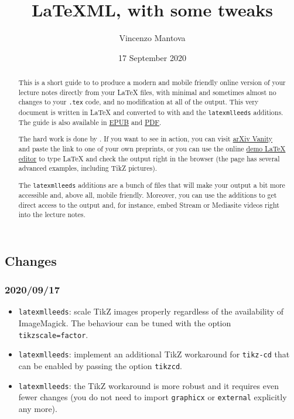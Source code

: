 \documentclass[a4paper]{article}
\title{LaTeXML, with some tweaks}
\author{Vincenzo Mantova}
\date{17 September 2020}
\theoremstyle{definition}
\begin{document}
\maketitle

\begin{abstract}
  This is a short guide to \LaTeXML{} to produce a modern and mobile friendly online version of your lecture notes directly from your \LaTeX{} files, with minimal and sometimes almost no changes to your \verb|.tex| code, and no modification at all of the \HTML{} output. This very document is written in \LaTeX{} and converted to \HTML{} with \LaTeXML{} and the \verb|latexmlleeds| additions. The guide is also available in \href{LaTeXML-Leeds.epub}{EPUB} and \href{LaTeXML-Leeds.pdf}{PDF}.

  The hard work is done by \LaTeXML{}. If you want to see \LaTeXML{} in action, you can visit \href{https://www.arxiv-vanity.com/}{arXiv Vanity} and paste the link to one of your own preprints, or you can use the online \href{https://latexml.mathweb.org/editor}{demo \LaTeX{} editor} to type \LaTeX{} and check the \HTML{} output right in the browser (the page has several advanced examples, including TikZ pictures).

  The \verb|latexmlleeds| additions are a bunch of files that will make your output a bit more accessible and, above all, mobile friendly. Moreover, you can use the additions to get direct access to the \HTML{} output and, for instance, embed Stream or Mediasite videos right into the lecture notes.
\end{abstract}

\subsection*{Changes}
\subsubsection*{2020/09/17}
\begin{itemize}
  \item \verb|latexmlleeds|: scale TikZ images properly regardless of the availability of ImageMagick. The behaviour can be tuned with the option \verb|tikzscale=factor|.
  \item \verb|latexmlleeds|: implement an additional TikZ workaround for \verb|tikz-cd| that can be enabled by passing the option \verb|tikzcd|.
  \item \verb|latexmlleeds|: the TikZ workaround is more robust and it requires even fewer changes (you do not need to import \verb|graphicx| or \verb|external| explicitly any more).
\end{itemize}
\end{document}
